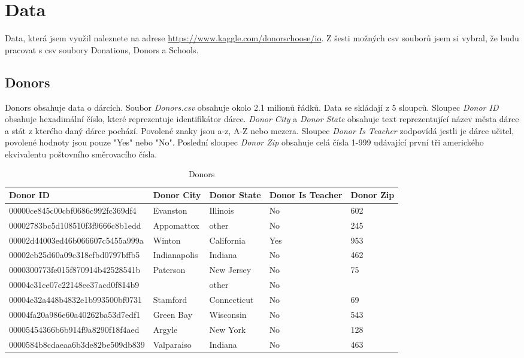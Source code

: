 \documentclass[12pt,a4paper]{article}
\begin{document}
\section{Data}
Data, která jsem využil naleznete na adrese \url{https://www.kaggle.com/donorschoose/io}. Z šesti možných csv souborů jsem si vybral, že budu pracovat s csv soubory Donations, Donors a Schools.
\subsection{Donors}
Donors obsahuje data o dárcích. Soubor \textit{Donors.csv} obsahuje okolo 2.1 milionů řádků. Data se skládají z 5 sloupců. Sloupec \textit{Donor ID} obsahuje hexadimální číslo, které reprezentuje identifikátor dárce. \textit{Donor City} a \textit{Donor State} obsahuje text reprezentující název města dárce a stát z kterého daný dárce pochází. Povolené znaky jsou a-z, A-Z nebo mezera. Sloupec \textit{Donor Is  Teacher} zodpovídá jestli je dárce učitel, povolené hodnoty jsou pouze "Yes" nebo "No". Poslední sloupec \textit{Donor Zip} obsahuje celá čísla 1-999 udávající první tři amerického ekvivalentu poštovního směrovacího čísla.
\begin{table}[!h]
\begin{tabularx}{1.05\textwidth}{lllXl}
Donor ID                         & Donor City   & Donor State & Donor Is Teacher & Donor Zip \\ \hline
00000ce845c00cbf0686c992fc369df4 & Evanston     & Illinois    & No               & 602       \\
00002783bc5d108510f3f9666c8b1edd & Appomattox   & other       & No               & 245       \\
00002d44003ed46b066607c5455a999a & Winton       & California  & Yes              & 953       \\
00002eb25d60a09c318efbd0797bffb5 & Indianapolis & Indiana     & No               & 462       \\
0000300773fe015f870914b42528541b & Paterson     & New Jersey  & No               & 75        \\
00004c31ce07c22148ee37acd0f814b9 &              & other       & No               &           \\
00004e32a448b4832e1b993500bf0731 & Stamford     & Connecticut & No               & 69        \\
00004fa20a986e60a40262ba53d7edf1 & Green Bay    & Wisconsin   & No               & 543       \\
00005454366b6b914f9a8290f18f4aed & Argyle       & New York    & No               & 128       \\
0000584b8cdaeaa6b3de82be509db839 & Valparaiso   & Indiana     & No               & 463      
\end{tabularx}
\caption{Donors}
\end{table}
\end{document}
